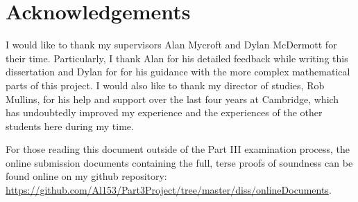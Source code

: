 \chapter*{Acknowledgements}
\thispagestyle{empty}

I would like to thank my supervisors Alan Mycroft and Dylan McDermott for their time. Particularly, I thank Alan for his detailed feedback while writing this dissertation and Dylan for for his guidance with the more complex mathematical parts of this project.
I would also like to thank my director of studies, Rob Mullins, for his help and support over the last four years at Cambridge, which has undoubtedly improved my experience and the experiences of the other students here during my time.


For those reading this document outside of the Part III examination process, the online submission documents containing the full, terse proofs of soundness can be found online on my github repository: \url{https://github.com/Al153/Part3Project/tree/master/diss/onlineDocuments}.


\clearpage